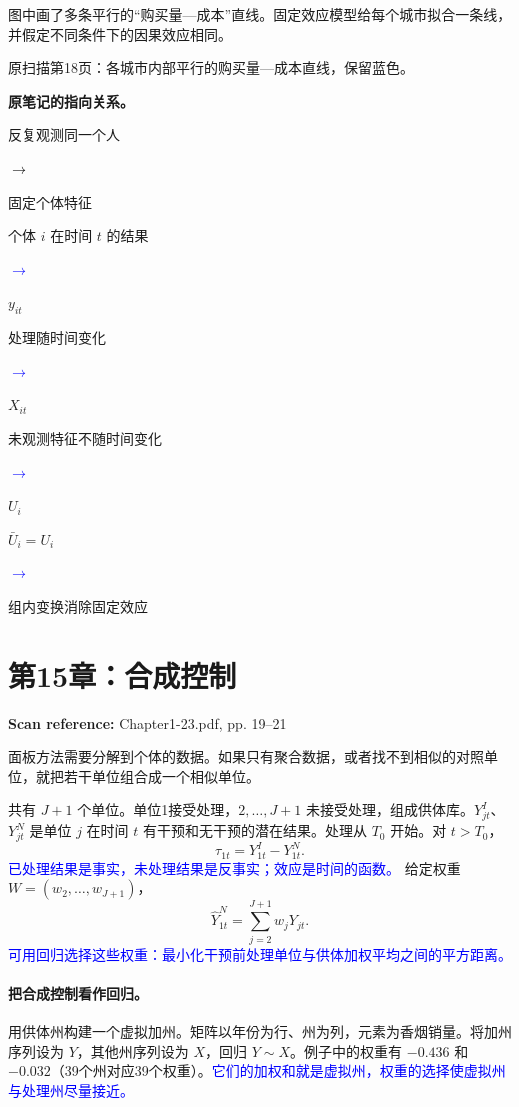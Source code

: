 \documentclass[11pt,a4paper]{article}
\newcommand{\sourcepages}[1]{\par{\small\sffamily\color{muted}\textbf{Scan reference:} #1\par}\nobreak\smallskip\nopagebreak[4]}
\newcommand{\inkblue}[1]{\textcolor{blue}{#1}}
\newcommand{\notearrow}[3]{%
\par\Needspace{6\baselineskip}\smallskip
\noindent\begin{minipage}[c]{0.43\linewidth}\raggedright\color{#1}#2\end{minipage}%
\hfill\textcolor{#1}{\(\longrightarrow\)}\hfill%
\begin{minipage}[c]{0.43\linewidth}\raggedright#3\end{minipage}\par\smallskip}
\begin{document}
{图中画了多条平行的“购买量—成本”直线。固定效应模型给每个城市拟合一条线，并假定不同条件下的因果效应相同。

\begin{center}
\par{\small 原扫描第18页：各城市内部平行的购买量—成本直线，保留蓝色。}
\end{center}
\par{}\smallskip\textbf{原笔记的指向关系。}\par\smallskip
\notearrow{black}{反复观测同一个人}{固定个体特征}
\notearrow{blue}{个体 $i$ 在时间 $t$ 的结果}{$y_{it}$}
\notearrow{blue}{处理随时间变化}{$X_{it}$}
\notearrow{blue}{未观测特征不随时间变化}{$U_i$}
\notearrow{blue}{$\bar U_i=U_i$}{组内变换消除固定效应}
\section{第15章：合成控制}
\sourcepages{Chapter1-23.pdf, pp. 19--21}
面板方法需要分解到个体的数据。如果只有聚合数据，或者找不到相似的对照单位，就把若干单位组合成一个相似单位。

共有 $J+1$ 个单位。单位1接受处理，$2,\ldots,J+1$ 未接受处理，组成供体库。$Y_{jt}^{I}$、$Y_{jt}^{N}$ 是单位 $j$ 在时间 $t$ 有干预和无干预的潜在结果。处理从 $T_0$ 开始。对 $t>T_0$，
\[\tau_{1t}=Y_{1t}^{I}-Y_{1t}^{N}.\]
\inkblue{已处理结果是事实，未处理结果是反事实；效应是时间的函数。} 给定权重 $W=(w_2,\ldots,w_{J+1})$，
\[\widehat Y_{1t}^{N}=\sum_{j=2}^{J+1}w_jY_{jt}.\]
\inkblue{可用回归选择这些权重：最小化干预前处理单位与供体加权平均之间的平方距离。}

\paragraph{把合成控制看作回归。}
用供体州构建一个虚拟加州。矩阵以年份为行、州为列，元素为香烟销量。将加州序列设为 $Y$，其他州序列设为 $X$，回归 $Y\sim X$。例子中的权重有 $-0.436$ 和 $-0.032$（39个州对应39个权重）。\inkblue{它们的加权和就是虚拟州，权重的选择使虚拟州与处理州尽量接近。}

}
\end{document}
